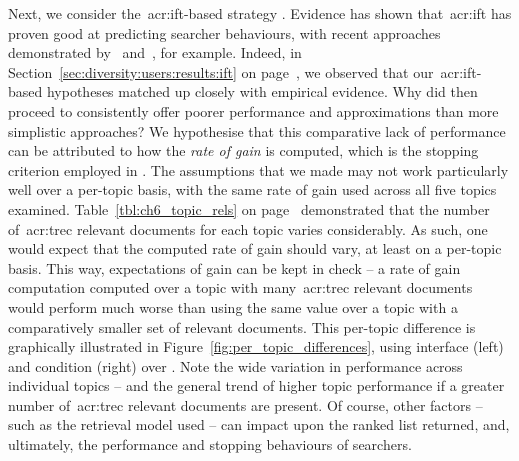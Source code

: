 Next, we consider the~\gls{acr:ift}-based strategy . Evidence has shown that~\gls{acr:ift} has proven good at predicting searcher behaviours, with recent approaches demonstrated by~\cite{ong2017scent_behaviour} and~\cite{azzopardi2018cwl}, for example. Indeed, in Section~\ref{sec:diversity:users:results:ift} on page~\pageref{sec:diversity:users:results:ift}, we observed that our~\gls{acr:ift}-based hypotheses matched up closely with empirical evidence. Why did  then proceed to consistently offer poorer performance and approximations than more simplistic approaches? We hypothesise that this comparative lack of performance can be attributed to how the \emph{rate of gain} is computed, which is the stopping criterion employed in . The assumptions that we made may not work particularly well over a per-topic basis, with the same rate of gain used across all five topics examined. Table~\ref{tbl:ch6_topic_rels} on page~\pageref{tbl:ch6_topic_rels} demonstrated that the number of~\gls{acr:trec} relevant documents for each topic varies considerably. As such, one would expect that the computed rate of gain should vary, at least on a per-topic basis. This way, expectations of gain can be kept in check -- a rate of gain computation computed over a topic with many~\gls{acr:trec} relevant documents would perform much worse than using the same value over a topic with a comparatively smaller set of relevant documents. This per-topic difference is graphically illustrated in Figure~\ref{fig:per_topic_differences}, using interface  (left) and condition  (right) over . Note the wide variation in performance across individual topics -- and the general trend of higher topic performance if a greater number of~\gls{acr:trec} relevant documents are present. Of course, other factors -- such as the retrieval model used -- can impact upon the ranked list returned, and, ultimately, the performance and stopping behaviours of searchers.

